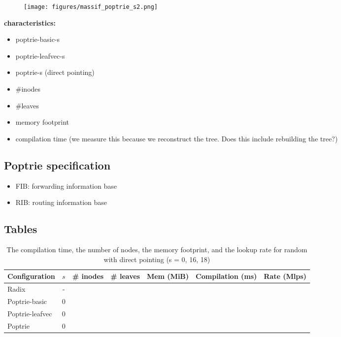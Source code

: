 \documentclass{article}
\begin{document}
\begin{figure}
\begin{center}
    \texttt{[image: figures/massif\_poptrie\_s2.png]}
\end{center}
\end{figure}
\textbf{characteristics:}
\begin{itemize}
    \item poptrie-basic-s
    \item poptrie-leafvec-s
    \item poptrie-s (direct pointing)
    \item \#inodes
    \item \#leaves
    \item memory footprint
    \item compilation time (we measure this because
    we reconstruct the tree. Does this include rebuilding the tree?)
\end{itemize}

\subsection{Poptrie specification}
\begin{itemize}
    \item FIB: forwarding information base
    \item RIB: routing information base
\end{itemize}

\subsection{Tables}
\begin{table}
    \begin{center}
        \begin{tabular}{|l|c|c|c|c|c|c|}
            \hline
            Configuration   & $s$ & \# inodes & \# leaves & Mem (MiB) & Compilation (ms) & Rate (Mlps) \\ 
            \hline
            Radix           & -   & & & & & \\ 
            \hline                           
            Poptrie-basic   & $0$ & & & & & \\  
            \hline                           
            Poptrie-leafvec & $0$ & & & & & \\
            \hline
            Poptrie         & $0$ & & & & & \\
            \hline
        \end{tabular}
    \end{center}
    \caption{The compilation time, the number of nodes, the memory footprint, and the lookup rate for
random with direct pointing (s = 0, 16, 18)}
\end{table}
\end{document}
